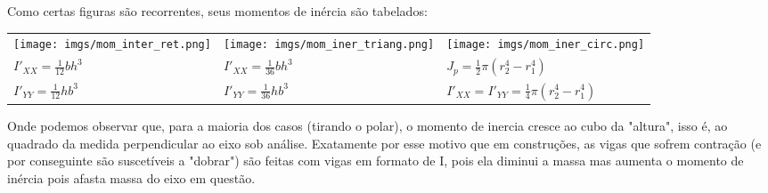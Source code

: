 \documentclass{article}
\begin{document}
\newpage
Como certas figuras são recorrentes, seus momentos de inércia são tabelados:

\begin{table}[h]
    \begin{tabularx}{\textwidth}{XXX}
        \begin{minipage}{\columnwidth}
            \texttt{[image: imgs/mom\_inter\_ret.png]}
        \end{minipage}   &
        \begin{minipage}{\columnwidth}
            \texttt{[image: imgs/mom\_iner\_triang.png]}
        \end{minipage} &
        \begin{minipage}{\columnwidth}
            \texttt{[image: imgs/mom\_iner\_circ.png]}
        \end{minipage}                                                                                                    \\

        $I'_{XX} = \frac{1}{12}bh^3$                                    & $I'_{XX} = \frac{1}{36}bh^3$ & $J_p = \frac{1}{2} \pi \left(r_2^4 - r_1^4 \right)$            \\
        $I'_{YY} = \frac{1}{12}hb^3$                                    & $I'_{YY}=\frac{1}{36}hb^3$   & $I'_{XX} = I'_{YY} = \frac{1}{4}\pi\left(r_2^4 - r_1^4\right)$
    \end{tabularx}
\end{table}

Onde podemos observar que, para a maioria dos casos (tirando o polar), o momento de inercia cresce ao cubo da "altura", isso é, ao quadrado da medida perpendicular ao eixo sob análise. Exatamente por
esse motivo que em construções, as vigas que sofrem contração (e por conseguinte são suscetíveis a "dobrar") são feitas com vigas em formato de I, pois ela diminui a massa mas aumenta o momento de inércia pois afasta massa do eixo em questão.
\end{document}
